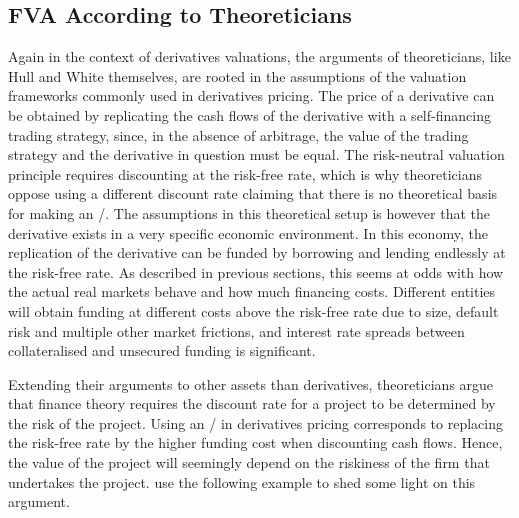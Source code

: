 \documentclass[main.tex]{subfiles}
\begin{document}
        \subsection{FVA According to Theoreticians}
            Again in the context of derivatives valuations, 
            the arguments of theoreticians, like Hull and White themselves, 
            are rooted in the assumptions of the valuation frameworks commonly used in derivatives pricing.
            The price of a derivative can be obtained by replicating the cash flows of the derivative 
            with a self-financing trading strategy, since, in the absence of arbitrage, 
            the value of the trading strategy and the derivative in question must be equal.
            The risk-neutral valuation principle requires discounting at the risk-free rate,
            which is why theoreticians oppose using a different discount rate
            claiming that there is no theoretical basis for making an \FVA/.
            The assumptions in this theoretical setup is however 
            that the derivative exists in a very specific economic environment. 
            In this economy, the replication of the derivative
            can be funded by borrowing and lending endlessly at the risk-free rate.
            As described in previous sections,
            this seems at odds with how the actual real markets behave and how much financing costs.
            Different entities will obtain funding at different costs above the risk-free rate due to size,
            default risk and multiple other market frictions,
            and interest rate spreads between collateralised and unsecured funding is significant.

            Extending their arguments to other assets than derivatives, 
            theoreticians argue that finance theory requires the discount rate for a project 
            to be determined by the risk of the project.
            Using an \FVA/ in derivatives pricing corresponds to replacing the risk-free rate by the higher funding cost
            when discounting cash flows.
            Hence, the value of the project will seemingly depend on the riskiness of the firm that undertakes the project.
            \textcite{HullWhite2012FVA} use the following example to shed some light on this argument.
\end{document}
